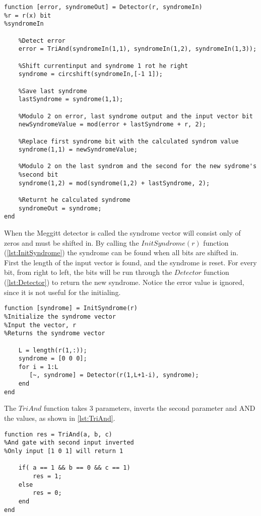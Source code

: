 \documentclass[Main]{subfiles}
\begin{document}
\begin{lstlisting}[caption=Detector function, style=Code-Matlab, label=lst:Detector]
function [error, syndromeOut] = Detector(r, syndromeIn)
%r = r(x) bit
%syndromeIn

    %Detect error
    error = TriAnd(syndromeIn(1,1), syndromeIn(1,2), syndromeIn(1,3));

    %Shift currentinput and syndrome 1 rot he right
    syndrome = circshift(syndromeIn,[-1 1]);

    %Save last syndrome
    lastSyndrome = syndrome(1,1);

    %Modulo 2 on error, last syndrome output and the input vector bit
    newSyndromeValue = mod(error + lastSyndrome + r, 2); 
    
    %Replace first syndrome bit with the calculated syndrom value
    syndrome(1,1) = newSyndromeValue;

    %Modulo 2 on the last syndrom and the second for the new sydrome's 
    %second bit
    syndrome(1,2) = mod(syndrome(1,2) + lastSyndrome, 2);

    %Returnt he calculated syndrome
    syndromeOut = syndrome;
end
\end{lstlisting}
When the Meggitt detector is called the syndrome vector will consist only of zeros and must be shifted in.
By calling the $InitSyndrome(r)$ function (\codeTitle \ref{lst:InitSyndrome}) the syndrome can be found when all bits are shifted in.
\\
First the length of the input vector is found, and the syndrome is reset.
For every bit, from right to left, the bits will be run through the $Detector$ function (\codeTitle \ref{lst:Detector}) to return the new syndrome.
Notice the error value is ignored, since it is not useful for the initialing.


\begin{lstlisting}[caption=InitSyndrome function, style=Code-Matlab, label=lst:InitSyndrome]
function [syndrome] = InitSyndrome(r)
%Initialize the syndrome vector
%Input the vector, r
%Returns the syndrome vector

    L = length(r(1,:));
    syndrome = [0 0 0];
    for i = 1:L
       [~, syndrome] = Detector(r(1,L+1-i), syndrome); 
    end
end
\end{lstlisting}
The $TriAnd$ function takes 3 parameters, inverts the second parameter and AND the values, as shown in \codeTitle \ref{lst:TriAnd}.

\begin{lstlisting}[caption=TriAnd function, style=Code-Matlab, label=lst:TriAnd]
function res = TriAnd(a, b, c)
%And gate with second input inverted
%Only input [1 0 1] will return 1

    if( a == 1 && b == 0 && c == 1)
        res = 1;
    else
        res = 0;
    end
end
\end{lstlisting}
\end{document}
